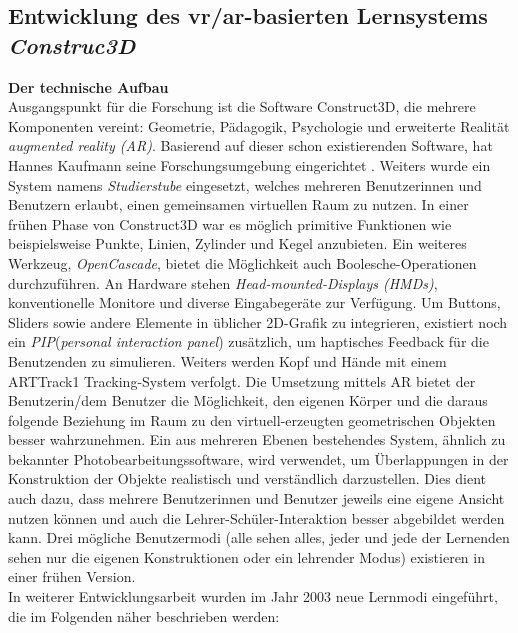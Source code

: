 \documentclass[deutsch]{llncs}
\begin{document}
\subsection{Entwicklung des vr/ar-basierten Lernsystems \emph{Construc3D} }
\textbf{Der technische Aufbau} \\
Ausgangspunkt für die Forschung ist die Software Construct3D, die mehrere Komponenten vereint: Geometrie, Pädagogik, Psychologie und erweiterte Realität \emph{augmented reality (AR)}.
Basierend auf dieser schon existierenden Software, hat Hannes Kaufmann seine Forschungsumgebung eingerichtet \cite{Kaufmann:2002:MGE:1242073.1242086}. 
Weiters wurde ein System namens \emph{Studierstube} eingesetzt, welches mehreren Benutzerinnen und Benutzern erlaubt, einen gemeinsamen virtuellen Raum zu nutzen.
In einer frühen Phase von Construct3D war es möglich primitive Funktionen wie beispielsweise Punkte, Linien, Zylinder und Kegel anzubieten.
Ein weiteres Werkzeug, \emph{OpenCascade}, bietet die Möglichkeit auch Boolesche-Operationen durchzuführen.
An Hardware stehen \emph{Head-mounted-Displays (HMDs)}, konventionelle Monitore und diverse Eingabegeräte zur Verfügung. Um Buttons, Sliders sowie andere Elemente in üblicher 2D-Grafik zu integrieren, existiert noch ein \emph{PIP}(\emph{personal interaction panel})  zusätzlich, um haptisches Feedback für die Benutzenden zu simulieren. Weiters werden Kopf und Hände mit einem ARTTrack1 Tracking-System verfolgt.
Die Umsetzung mittels AR bietet der Benutzerin/dem Benutzer die Möglichkeit, den eigenen Körper und die daraus folgende Beziehung im Raum zu den virtuell-erzeugten geometrischen Objekten besser wahrzunehmen. 
Ein aus mehreren Ebenen bestehendes System, ähnlich zu bekannter Photobearbeitungssoftware, wird verwendet, um Überlappungen in der Konstruktion der Objekte realistisch und verständlich darzustellen. Dies dient auch dazu, dass mehrere Benutzerinnen und Benutzer jeweils eine eigene Ansicht nutzen können und auch die Lehrer-Schüler-Interaktion besser abgebildet werden kann. 
Drei mögliche Benutzermodi (alle sehen alles, jeder und jede der Lernenden sehen nur die eigenen Konstruktionen oder ein lehrender Modus) existieren in einer frühen Version. \\
In weiterer Entwicklungsarbeit wurden im Jahr 2003 neue Lernmodi eingeführt, die im Folgenden näher beschrieben werden:
 \\
\end{document}
